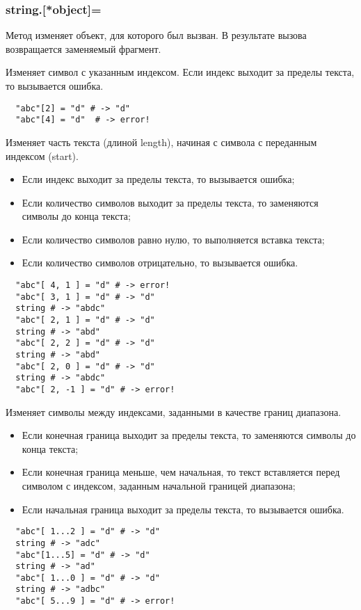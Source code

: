 \subsubsection*{string.[*object]=}

Метод изменяет объект, для которого был вызван. В результате вызова возвращается заменяемый фрагмент.

\begin{methodlist}
  Изменяет символ с указанным индексом. Если индекс выходит за пределы текста, то вызывается ошибка.
  \begin{verbatim}
  "abc"[2] = "d" # -> "d"
  "abc"[4] = "d"  # -> error!
  \end{verbatim}

  Изменяет часть текста (длиной length), начиная с символа с переданным индексом (start).
  \begin{itemize}
    \item Если индекс выходит за пределы текста, то вызывается ошибка;
    \item Если количество символов выходит за пределы текста, то заменяются символы до конца текста;
    \item Если количество символов равно нулю, то выполняется вставка текста;
    \item Если количество символов отрицательно, то вызывается ошибка.
  \end{itemize}
  \begin{verbatim}
  "abc"[ 4, 1 ] = "d" # -> error!
  "abc"[ 3, 1 ] = "d" # -> "d"
  string # -> "abdc"
  "abc"[ 2, 1 ] = "d" # -> "d"
  string # -> "abd"
  "abc"[ 2, 2 ] = "d" # -> "d"
  string # -> "abd"
  "abc"[ 2, 0 ] = "d" # -> "d"
  string # -> "abdc"
  "abc"[ 2, -1 ] = "d" # -> error!
  \end{verbatim}

  Изменяет символы между индексами, заданными в качестве границ диапазона. 
  \begin{itemize}
    \item Если конечная граница выходит за пределы текста, то заменяются символы до конца текста;
    \item Если конечная граница меньше, чем начальная, то текст вставляется перед символом с индексом, заданным начальной границей диапазона;
    \item Если начальная граница выходит за пределы текста, то вызывается ошибка.
  \end{itemize}
  \begin{verbatim}
  "abc"[ 1...2 ] = "d" # -> "d"
  string # -> "adc"
  "abc"[1...5] = "d" # -> "d"
  string # -> "ad"
  "abc"[ 1...0 ] = "d" # -> "d"
  string # -> "adbc"
  "abc"[ 5...9 ] = "d" # -> error!
  \end{verbatim}


\end{methodlist}
